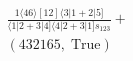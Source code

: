 \documentclass[varwidth, border=5pt]{standalone}
\begin{document}
\begin{my}
$\begin{gathered}
\scriptscriptstyle\frac{1⟨46⟩[12]⟨3|1+2|5]}{⟨1|2+3|4]⟨4|2+3|1]s_{123}}+\\
\scriptscriptstyle(432165,\;\text{True})\phantom{+}
\end{gathered}$
\end{my}
\end{document}
